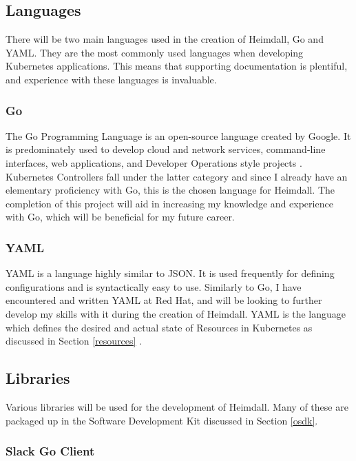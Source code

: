 \documentclass{article}
\begin{document}
\subsection{Languages}
There will be two main languages used in the creation of Heimdall, Go and YAML. They are the most commonly used languages when developing Kubernetes applications. This means that supporting documentation is plentiful, and experience with these languages is invaluable.  

\subsubsection{Go}

The Go Programming Language is an open-source language created by Google. It is predominately used to develop cloud and network services, command-line interfaces, web applications, and Developer Operations style projects \cite{go-dev}. Kubernetes Controllers fall under the latter category and since I already have an elementary proficiency with Go, this is the chosen language for Heimdall. The completion of this project will aid in increasing my knowledge and experience with Go, which will be beneficial for my future career.

\subsubsection{YAML}

YAML is a language highly similar to JSON. It is used frequently for defining configurations and is syntactically easy to use. Similarly to Go, I have encountered and written YAML at Red Hat, and will be looking to further develop my skills with it during the creation of Heimdall. YAML is the language which defines the desired and actual state of Resources in Kubernetes as discussed in Section \ref{resources} \cite{yaml-blog}. 

\subsection{Libraries}

Various libraries will be used for the development of Heimdall. Many of these are packaged up in the Software Development Kit discussed in Section \ref{osdk}. 


\subsubsection{Slack Go Client}
\end{document}
